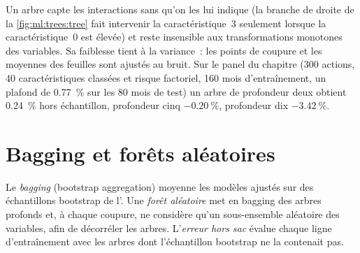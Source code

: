 \begin{omfigure}

\label{fig:ml:trees:tree}
\end{omfigure}

Un arbre capte les interactions sans qu'on les lui indique (la branche de droite de la \cref{fig:ml:trees:tree} fait intervenir la caractéristique~3
seulement lorsque la caractéristique~0 est élevée) et reste insensible aux transformations monotones des variables. Sa
faiblesse tient à la variance~: les points de coupure et les moyennes des feuilles sont ajustés au bruit. Sur le panel du chapitre (300 actions, 40
caractéristiques classées et risque factoriel, 160 mois d'entraînement, un plafond de 0.77~\% sur les 80 mois de test) un arbre de
profondeur deux obtient 0.24~\% hors échantillon, profondeur cinq $-0.20~\%$, profondeur dix $-3.42~\%$.

\section{Bagging et forêts aléatoires}

\begin{definition}\label{def:ml:trees-and-boosting:bagging}
Le \emph{bagging} (bootstrap aggregation) moyenne les modèles ajustés sur des échantillons bootstrap de l'.
Une \emph{forêt aléatoire} met en bagging des arbres profonds et, à chaque coupure, ne considère qu'un sous-ensemble aléatoire des
variables, afin de décorréler les arbres. L'\emph{erreur hors sac} évalue chaque ligne d'entraînement avec
les arbres dont l'échantillon bootstrap ne la contenait pas.
\end{definition}

